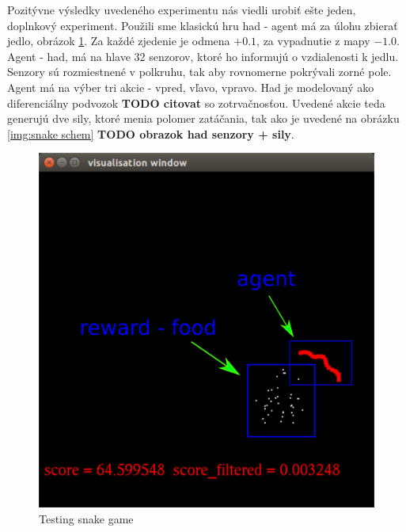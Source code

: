 \documentclass[10pt,a4paper]{article}
\begin{document}
Pozitývne výsledky uvedeného experimentu nás viedli urobiť ešte jeden, doplnkový experiment.
Použili sme klasickú hru had - agent má za úlohu zbierať jedlo, obrázok \ref{img:Testing snake game}.
Za každé zjedenie je odmena $+0.1$, za vypadnutie z mapy $-1.0$. Agent - had, má na
hlave 32 senzorov, ktoré ho informujú o vzdialenosti k jedlu. Senzory sú rozmiestnené
v polkruhu, tak aby rovnomerne pokrývali zorné pole.
Agent má na výber tri akcie - vpred, vľavo, vpravo. Had je modelovaný ako diferenciálny
podvozok {\bf TODO citovat} so zotrvačnosťou. Uvedené akcie teda generujú dve sily, ktoré
menia polomer zatáčania, tak ako je uvedené na obrázku \ref{img:snake schem} {\bf TODO obrazok had senzory + sily}.

\begin{figure}[!h]
  \centering
  \includegraphics[scale=0.4]{../../diagrams/worms_rl_game_desc.png}
  \caption{Testing snake game}
  \label{img:Testing snake game}
\end{figure}
\end{document}
